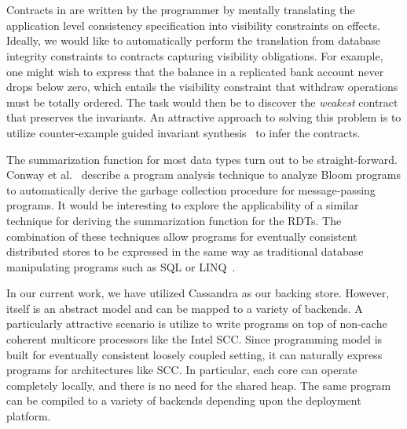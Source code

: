 \section{\quelea}

Contracts in \quelea are written by the programmer by mentally translating the
application level consistency specification into visibility constraints on
effects. Ideally, we would like to automatically perform the translation from
database integrity constraints to contracts capturing visibility obligations.
For example, one might wish to express that the balance in a replicated bank
account never drops below zero, which entails the visibility constraint that
withdraw operations must be totally ordered. The task would then be to discover
the \emph{weakest} contract that preserves the invariants. An attractive
approach to solving this problem is to utilize counter-example guided invariant
synthesis~\cite{Cegis} to infer the contracts.

The summarization function for most data types turn out to be straight-forward.
Conway et al.~\cite{edelweiss} describe a program analysis technique to analyze
Bloom programs to automatically derive the garbage collection procedure for
message-passing programs. It would be interesting to explore the applicability
of a similar technique for deriving the summarization function for the RDTs.
The combination of these techniques allow programs for eventually consistent
distributed stores to be expressed in the same way as traditional database
manipulating programs such as SQL or LINQ~\cite{Meijer2011}.

In our current work, we have utilized Cassandra as our backing store. However,
\quelea itself is an abstract model and can be mapped to a variety of backends.
A particularly attractive scenario is utilize \quelea to write programs on top
of non-cache coherent multicore processors like the Intel SCC. Since \quelea
programming model is built for eventually consistent loosely coupled setting,
it can naturally express programs for architectures like SCC. In particular,
each core can operate completely locally, and there is no need for the shared
heap. The same \quelea program can be compiled to a variety of backends
depending upon the deployment platform.
